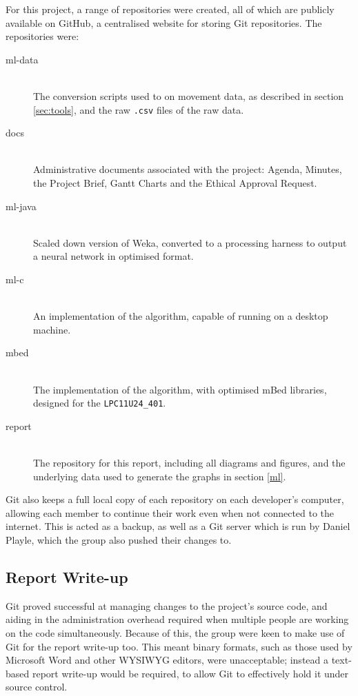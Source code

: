 For this project, a range of repositories were created, all of which are publicly available on GitHub, a centralised website for storing Git repositories. The repositories were:

\begin{description}
    \item[ml-data] \hfill \\ The conversion scripts used to on movement data, as described in section \ref{sec:tools}, and the raw \verb|.csv| files of the raw data.
    \item[docs] \hfill \\ Administrative documents associated with the project: Agenda, Minutes, the Project Brief, Gantt Charts and the Ethical Approval Request.
    \item[ml-java] \hfill \\ Scaled down version of Weka, converted to a processing harness to output a neural network in optimised format.
    \item[ml-c] \hfill \\ An implementation of the algorithm, capable of running on a desktop machine.
    \item[mbed] \hfill \\ The implementation of the algorithm, with optimised mBed libraries, designed for the \verb|LPC11U24_401|.
    \item[report] \hfill \\ The repository for this report, including all diagrams and figures, and the underlying data used to generate the graphs in section \ref{ml}.
\end{description}

Git also keeps a full local copy of each repository on each developer's computer, allowing each member to continue their work even when not connected to the internet. This is acted as a backup, as well as a Git server which is run by Daniel Playle, which the group also pushed their changes to.

\subsection{Report Write-up}
Git proved successful at managing changes to the project's source code, and aiding in the administration overhead required when multiple people are working on the code simultaneously. Because of this, the group were keen to make use of Git for the report write-up too. This meant binary formats, such as those used by Microsoft Word and other WYSIWYG editors, were unacceptable; instead a text-based report write-up would be required, to allow Git to effectively hold it under source control.

